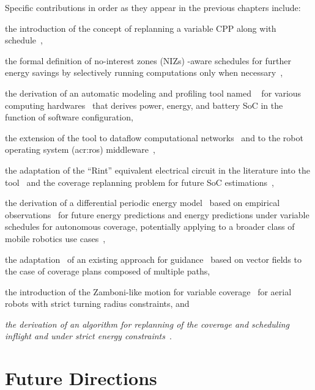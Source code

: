Specific contributions in order as they appear in the previous chapters include:
\begin{enumerate*}[label={(\alph*)},font={\textit}]
  \item the introduction of the concept of replanning a variable CPP along with schedule~\citep{seewald202Xenergy},
  \item the formal definition of no-interest zones (NIZs) -aware schedules for further energy savings by selectively running computations only when necessary~\citep{seewald202Xenergy},
  \item the derivation of an automatic modeling and profiling tool named \powprof{}~\citep{seewald2019coarse} for various computing hardwares~\citep{powprofiler} that derives power, energy, and battery SoC in the function of software configuration,
  \item the extension of the \powprof{} tool to dataflow computational networks~\citep{seewald2019component} and to the robot operating system (\Gls{acr:ros}) middleware~\citep{zamanakos2020energy},
  \item the adaptation of the ``Rint'' equivalent electrical circuit in the literature into the \powprof{} tool~\citep{seewald2019coarse} and the coverage replanning problem for future SoC estimations~\citep{seewald202Xenergy},
  \item the derivation of a differential periodic energy model~\citep{seewald202Xenergy} based on empirical observations~\citep{seewald2020mechanical} for future energy predictions and energy predictions under variable schedules for autonomous coverage, potentially applying to a broader class of mobile robotics use cases~\citep{seewald2020beyond},
  \item the adaptation~\citep{seewald202Xenergy} of an existing approach for guidance~\citep{de2017guidance} based on vector fields to the case of coverage plans composed of multiple paths,
  \item the introduction of the Zamboni-like motion for variable coverage~\citep{seewald202Xenergy} for aerial robots with strict turning radius constraints, and
  \item {\itshape the derivation of an algorithm for replanning of the coverage and scheduling inflight and under strict energy constraints}~\citep{seewald202Xenergy}.
\end{enumerate*} 


\section{Future Directions}
\label{sec:conc-future}

